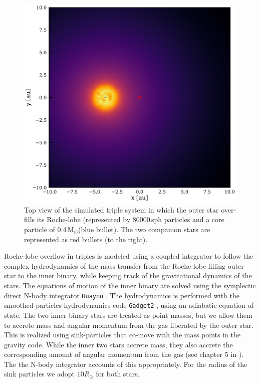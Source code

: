 \documentclass{aastex62}
\newcommand{\MSun}{\mbox{M$_\odot$}}
\begin{document}
\begin{figure}[ht!]
  \includegraphics[width=\columnwidth]{fig_t0_N80000_M012MSun1109MSun_a02au_e00_inc9deg.pdf}
\caption{Top view of the simulated triple system in which the outer
  star over-fills its Roche-lobe (represented by 80000\,sph particles
  and a core particle of 0.4\,\MSun (blue bullet). The two companion
  stars are represented as red bullets (to the right).
\label{fig:topview_at_t0}}
\end{figure}

Roche-lobe overflow in triples is modeled using a coupled integrator
to follow the complex hydrodynamics of the mass transfer from the
Roche-lobe filling outer star to the inner binary, while keeping track
of the gravitational dynamics of the stars.  The equations of motion
of the inner binary are solved using the symplectic direct N-body
integrator \texttt{Huayno} \citep{2012NewA...17..711P}. The
hydrodynamics is performed with the smoothed-particles hydrodynamics
code \texttt{Gadget2} \citep{2000ascl.soft03001S}, using an adiabatic
equation of state.  The two inner binary stars are treated as point
masses, but we allow them to accrete mass and angular momentum from
the gas liberated by the outer star.  This is realized using
sink-particles that co-move with the mass points in the gravity
code. While the inner two stars accrete mass, they also accrete the
corresponding amount of angular momentum from the gas (see chapter 5
in \cite{AMUSE}).  The the N-body integrator accounts of this
appropriately.  For the radius of the sink particles we adopt $10
R_\odot$ for both stars.
\end{document}
